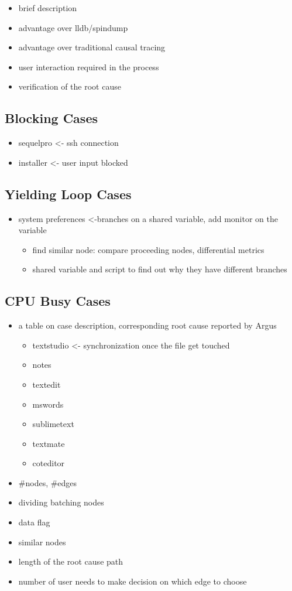 \begin{itemize}
\item{brief description}
\item{advantage over lldb/spindump}
\item{advantage over traditional causal tracing}
\item{user interaction required in the process}
\item{verification of the root cause}
\end{itemize}

\subsection{Blocking Cases}
\begin{itemize}
\item sequelpro <- ssh connection
\item installer <- user input blocked
\end{itemize}


\subsection{Yielding Loop Cases}
\begin{itemize}
\item system preferences <-branches on a shared variable, add monitor on the variable
	\begin{itemize}
		\item find similar node: compare proceeding nodes, differential metrics
		\item shared variable and script to find out why they have different branches
	\end{itemize}
\end{itemize}

\subsection{CPU Busy Cases}
\begin{itemize}
\item  a table on case description, corresponding root cause reported by Argus
	\begin{itemize}
	\item textstudio <- synchronization once the file get touched %
	\item notes
	\item textedit
	\item mswords
	\item sublimetext
	\item textmate
	\item coteditor
	\end{itemize}
\end{itemize}

\begin{itemize}
\item #nodes, #edges
\item dividing batching nodes
\item data flag
\item similar nodes
\item length of the root cause path
\item number of user needs to make decision on which edge to choose
\end{itemize}
